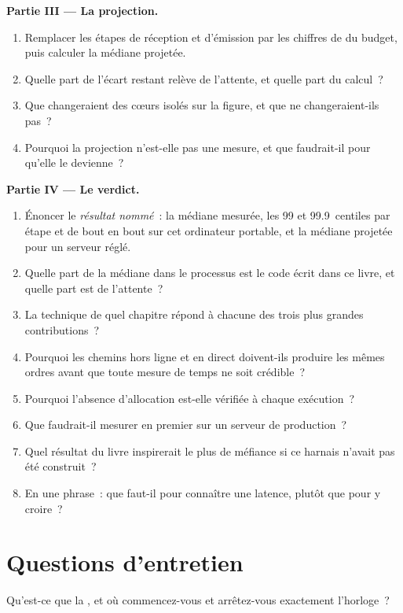 \begin{problem}
\medskip\noindent\textbf{Partie III --- La projection.}
\begin{enumerate}[resume]
\item Remplacer les étapes de réception et d'émission par les chiffres de  du budget, puis calculer la médiane projetée.
\item Quelle part de l'écart restant relève de l'attente, et quelle part du calcul~?
\item Que changeraient des cœurs isolés sur la figure, et que ne changeraient-ils pas~?
\item Pourquoi la projection n'est-elle pas une mesure, et que faudrait-il pour qu'elle le devienne~?
\end{enumerate}

\medskip\noindent\textbf{Partie IV --- Le verdict.}
\begin{enumerate}[resume]
\item Énoncer le \emph{résultat nommé}~: la médiane mesurée, les 99 et 99.9~centiles par étape et de bout en bout sur cet ordinateur portable,
et la médiane projetée pour un serveur réglé.
\item Quelle part de la médiane dans le processus est le code écrit dans ce livre, et quelle part est de l'attente~?
\item La technique de quel chapitre répond à chacune des trois plus grandes contributions~?
\item Pourquoi les chemins hors ligne et en direct doivent-ils produire les mêmes ordres avant que toute mesure de temps ne soit crédible~?
\item Pourquoi l'absence d'allocation est-elle vérifiée à chaque exécution~?
\item Que faudrait-il mesurer en premier sur un serveur de production~?
\item Quel résultat du livre inspirerait le plus de méfiance si ce harnais n'avait pas été construit~?
\item En une phrase~: que faut-il pour connaître une latence, plutôt que pour y croire~?
\end{enumerate}
\end{problem}

\section{Questions d'entretien}

\begin{interviewq}\label{iq:ll:build-tick-to-trade-measured:1}
Qu'est-ce que la , et où commencez-vous et arrêtez-vous exactement l'horloge~?
\end{interviewq}

